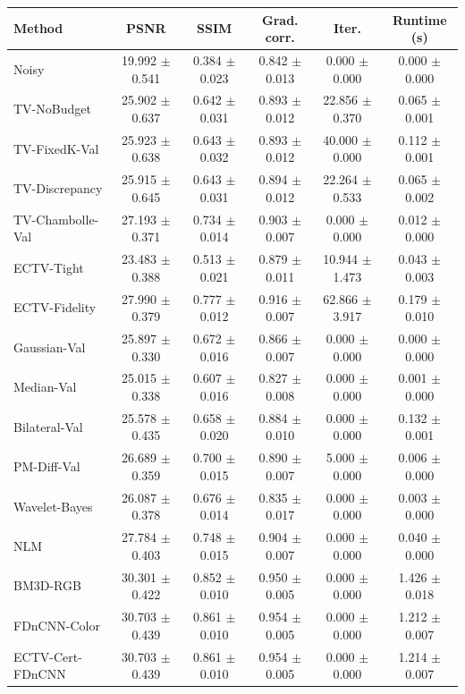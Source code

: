 \begin{tabular}{lccccc}
\toprule
Method & PSNR & SSIM & Grad. corr. & Iter. & Runtime (s) \\
\midrule
Noisy & 19.992 $\pm$ 0.541 & 0.384 $\pm$ 0.023 & 0.842 $\pm$ 0.013 & 0.000 $\pm$ 0.000 & 0.000 $\pm$ 0.000 \\
TV-NoBudget & 25.902 $\pm$ 0.637 & 0.642 $\pm$ 0.031 & 0.893 $\pm$ 0.012 & 22.856 $\pm$ 0.370 & 0.065 $\pm$ 0.001 \\
TV-FixedK-Val & 25.923 $\pm$ 0.638 & 0.643 $\pm$ 0.032 & 0.893 $\pm$ 0.012 & 40.000 $\pm$ 0.000 & 0.112 $\pm$ 0.001 \\
TV-Discrepancy & 25.915 $\pm$ 0.645 & 0.643 $\pm$ 0.031 & 0.894 $\pm$ 0.012 & 22.264 $\pm$ 0.533 & 0.065 $\pm$ 0.002 \\
TV-Chambolle-Val & 27.193 $\pm$ 0.371 & 0.734 $\pm$ 0.014 & 0.903 $\pm$ 0.007 & 0.000 $\pm$ 0.000 & 0.012 $\pm$ 0.000 \\
ECTV-Tight & 23.483 $\pm$ 0.388 & 0.513 $\pm$ 0.021 & 0.879 $\pm$ 0.011 & 10.944 $\pm$ 1.473 & 0.043 $\pm$ 0.003 \\
ECTV-Fidelity & 27.990 $\pm$ 0.379 & 0.777 $\pm$ 0.012 & 0.916 $\pm$ 0.007 & 62.866 $\pm$ 3.917 & 0.179 $\pm$ 0.010 \\
Gaussian-Val & 25.897 $\pm$ 0.330 & 0.672 $\pm$ 0.016 & 0.866 $\pm$ 0.007 & 0.000 $\pm$ 0.000 & 0.000 $\pm$ 0.000 \\
Median-Val & 25.015 $\pm$ 0.338 & 0.607 $\pm$ 0.016 & 0.827 $\pm$ 0.008 & 0.000 $\pm$ 0.000 & 0.001 $\pm$ 0.000 \\
Bilateral-Val & 25.578 $\pm$ 0.435 & 0.658 $\pm$ 0.020 & 0.884 $\pm$ 0.010 & 0.000 $\pm$ 0.000 & 0.132 $\pm$ 0.001 \\
PM-Diff-Val & 26.689 $\pm$ 0.359 & 0.700 $\pm$ 0.015 & 0.890 $\pm$ 0.007 & 5.000 $\pm$ 0.000 & 0.006 $\pm$ 0.000 \\
Wavelet-Bayes & 26.087 $\pm$ 0.378 & 0.676 $\pm$ 0.014 & 0.835 $\pm$ 0.017 & 0.000 $\pm$ 0.000 & 0.003 $\pm$ 0.000 \\
NLM & 27.784 $\pm$ 0.403 & 0.748 $\pm$ 0.015 & 0.904 $\pm$ 0.007 & 0.000 $\pm$ 0.000 & 0.040 $\pm$ 0.000 \\
BM3D-RGB & 30.301 $\pm$ 0.422 & 0.852 $\pm$ 0.010 & 0.950 $\pm$ 0.005 & 0.000 $\pm$ 0.000 & 1.426 $\pm$ 0.018 \\
FDnCNN-Color & 30.703 $\pm$ 0.439 & 0.861 $\pm$ 0.010 & 0.954 $\pm$ 0.005 & 0.000 $\pm$ 0.000 & 1.212 $\pm$ 0.007 \\
ECTV-Cert-FDnCNN & 30.703 $\pm$ 0.439 & 0.861 $\pm$ 0.010 & 0.954 $\pm$ 0.005 & 0.000 $\pm$ 0.000 & 1.214 $\pm$ 0.007 \\
\bottomrule
\end{tabular}
